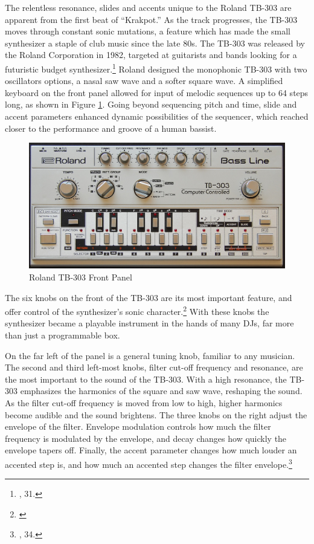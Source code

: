 \documentclass[12pt,twoside]{reedthesis}
\begin{document}
The relentless resonance, slides and accents unique to the Roland TB-303 are apparent from the first beat of ``Krakpot.'' As the track progresses, the TB-303 moves through constant sonic mutations, a feature which has made the small synthesizer a staple of club music since the late 80s. The TB-303 was released by the Roland Corporation in 1982, targeted at guitarists and bands looking for a futuristic budget synthesizer.\footnote{\cite{reynoldsGenerationEcstasyWorld1998}, 31.}  Roland designed the monophonic TB-303 with two oscillators options, a nasal saw wave and a softer square wave. A simplified keyboard on the front panel allowed for input of melodic sequences up to 64 steps long, as shown in Figure \ref{fig:tb303}. Going beyond sequencing pitch and time, slide and accent parameters enhanced dynamic possibilities of the sequencer, which reached closer to the performance and groove of a human bassist.

\begin{figure}[htbp]
	\begin{centering}
		\includegraphics[width=5in]{./Images/Roland_TB-303_Panel}
		\caption{Roland TB-303 Front Panel}
		\label{fig:tb303}
	\end{centering}
\end{figure}

The six knobs on the front of the TB-303 are its most important feature, and offer control of the synthesizer's sonic character.\footnote{\cite{simsRolandTB303Panel2008}} With these knobs the synthesizer became a playable instrument in the hands of many DJs, far more than just a programmable box.

On the far left of the panel is a general tuning knob, familiar to any musician. The second and third left-most knobs, filter cut-off frequency and resonance, are the most important to the sound of the TB-303. With a high resonance, the TB-303 emphasizes the harmonics of the square and saw wave, reshaping the sound. As the filter cut-off frequency is moved from low to high, higher harmonics become audible and the sound brightens. The three knobs on the right adjust the envelope of the filter. Envelope modulation controls how much the filter frequency is modulated by the envelope, and decay changes how quickly the envelope tapers off. Finally, the accent parameter changes how much louder an accented step is, and how much an accented step changes the filter envelope.\footnote{\cite{RolandTB303Owner1981}, 34.}
\end{document}
